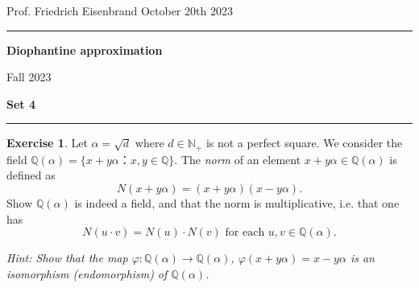 \documentclass[12pt,a4paper]{article}
\date{}
\theoremstyle{plain}
\newtheorem*{Sol*}{Solution}
\theoremstyle{definition}
\newtheorem{Ex}{Exercise}
\def \Q {\mathbb Q}
\newif\ifsolutions
\newcommand{\exercise}[2]{
			\begin{Ex} #1 \end{Ex}
			\ifsolutions  \begin{Sol*} #2 \end{Sol*} \bigskip \else \bigskip  \fi
		}
\begin{document}
\begin{center}
{Prof. Friedrich Eisenbrand \hfill October 20th 2023}
\end{center}
	
\hrule\vspace{\baselineskip}

\begin{center}
\textbf{Diophantine approximation}

Fall 2023

\bigskip

\textbf{Set 4}
\ifsolutions{\textbf{- Solutions}} \else{} \fi
\end{center}

\hrule\vspace{\baselineskip}



\exercise{ Let $α = \sqrt{d}$ where $d ∈ ℕ_+$ is not a perfect square. We consider the field $ℚ(α) = \{ x + y α ： x, y ∈ℚ \}$.  The \emph{norm} of an element $x +  y α ∈ ℚ(α)$ is defined as
  \begin{displaymath}
    N(x +  y α) = (x +  y α)(x -  y α). 
  \end{displaymath}
  Show $\Q(\alpha)$ is indeed a field, and that the norm is multiplicative, i.e. that one has
  \begin{displaymath}
    N(u⋅v) = N(u)⋅N(v) \text{ for each } u,v ∈ℚ(α). 
  \end{displaymath}

{\bigskip \noindent  \small \emph{ Hint: Show that the map $φ: ℚ(α) → ℚ(α)$, $φ( x + y α ) =  x - y α $ is an isomorphism (endomorphism) of $ℚ(α)$.} }
}
{
	The norm of an element of the field may be understood as the determinant of its multiplication matrix (in any basis).
	Indeed, take $\alpha = x + y \sqrt{d}$, and write the multiplication by $\alpha$ matrix in the basis $\{ 1, \sqrt{d} \}$
	\[
		[ \times \alpha ] = \begin{pmatrix} x & d y \\ y & x \end{pmatrix},
	\]
	which has determinant $x^2 - d y^2$.

	By commutativity of the field, the multiplication maps commute, which yields
		\[
		N(u \cdot v) = \det([ \times (u \cdot v) ]) = \det( [\times u] \cdot [\times v] ) = N(u) \cdot N(v), \]
	as required.

}
\end{document}
